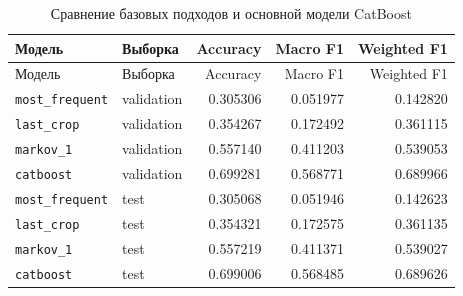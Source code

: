 \begin{center}
\small
\begin{longtable}{p{} p{} r r r}
\caption{Сравнение базовых подходов и основной модели CatBoost}
\label{tab:baseline-catboost-comparison}\\
\toprule
Модель & Выборка & Accuracy & Macro F1 & Weighted F1 \\
\midrule
\endfirsthead

\toprule
Модель & Выборка & Accuracy & Macro F1 & Weighted F1 \\
\midrule
\endhead

\bottomrule
\endlastfoot

\texttt{most\_frequent} & validation & 0.305306 & 0.051977 & 0.142820 \\
\texttt{last\_crop} & validation & 0.354267 & 0.172492 & 0.361115 \\
\texttt{markov\_1} & validation & 0.557140 & 0.411203 & 0.539053 \\
\texttt{catboost} & validation & 0.699281 & 0.568771 & 0.689966 \\

\texttt{most\_frequent} & test & 0.305068 & 0.051946 & 0.142623 \\
\texttt{last\_crop} & test & 0.354321 & 0.172575 & 0.361135 \\
\texttt{markov\_1} & test & 0.557219 & 0.411371 & 0.539027 \\
\texttt{catboost} & test & 0.699006 & 0.568485 & 0.689626 \\

\end{longtable}
\end{center}
